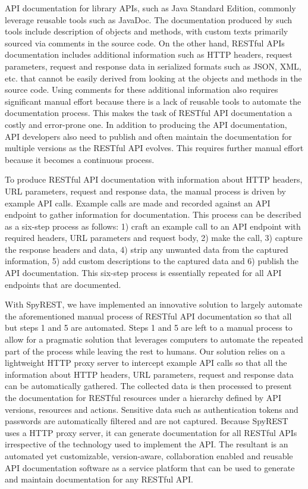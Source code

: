 \documentclass[conference]{IEEEtran}
\begin{document}
API documentation for library APIs, such as Java Standard Edition, commonly leverage reusable tools such as JavaDoc. The documentation produced by such tools include description of objects and methods, with custom texts primarily sourced via comments in the source code. On the other hand, RESTful APIs documentation includes additional information such as HTTP headers, request parameters, request and response data in serialized formats such as JSON, XML, etc. that cannot be easily derived from looking at the objects and methods in the source code. Using comments for these additional information also requires significant manual effort because there is a lack of reusable tools to automate the documentation process. This makes the task of RESTful API documentation a costly and error-prone one. In addition to producing the API documentation, API developers also need to publish and often maintain the documentation for multiple versions as the RESTful API evolves. This requires further manual effort because it becomes a continuous process.

To produce RESTful API documentation with information about HTTP headers, URL parameters, request and response data, the manual process is driven by example API calls. Example calls are made and recorded against an API endpoint to gather information for documentation. This process can be described as a six-step process as follows: 1) craft an example call to an API endpoint with required headers, URL parameters and request body, 2) make the call, 3) capture the response headers and data, 4) strip any unwanted data from the captured information, 5) add custom descriptions to the captured data and 6) publish the API documentation. This six-step process is essentially repeated for all API endpoints that are documented.

With SpyREST, we have implemented an innovative solution to largely automate the aforementioned manual process of RESTful API documentation so that all but steps 1 and 5 are automated. Steps 1 and 5 are left to a manual process to allow for a pragmatic solution that leverages computers to automate the repeated part of the process while leaving the rest to humans. Our solution relies on a lightweight HTTP proxy server to intercept example API calls so that all the information about HTTP headers, URL parameters, request and response data can be automatically gathered. The collected data is then processed to present the documentation for RESTful resources under a hierarchy defined by API versions, resources and actions. Sensitive data such as authentication tokens and passwords are automatically filtered and are not captured. Because SpyREST uses a HTTP proxy server, it can generate documentation for all RESTful APIs irrespective of the technology used to implement the API. The resultant is an automated yet customizable, version-aware, collaboration enabled and reusable API documentation software as a service platform that can be used to generate and maintain documentation for any RESTful API.
\end{document}
